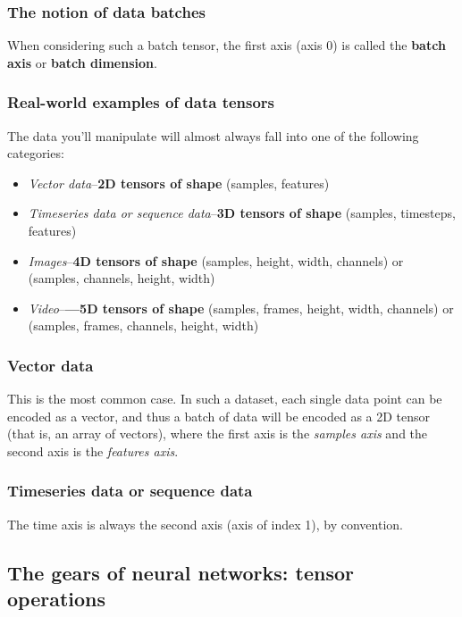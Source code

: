 \documentclass{article}
\numberwithin{equation}{section} %
\begin{document}
\subsubsection{The notion of data batches}

When considering such a batch tensor, the first axis (axis 0) is called the \textbf{batch axis} or \textbf{batch dimension}.

\subsubsection{Real-world examples of data tensors}

The data you’ll manipulate will almost always fall into one of the following categories: \\

\begin{itemize}
	\item \textit{Vector data}--\textbf{2D tensors of shape} (samples, features)
	\item \textit{Timeseries data or sequence data}--\textbf{3D tensors of shape} (samples, timesteps, features)
	\item \textit{Images}--\textbf{4D tensors of shape} (samples, height, width, channels) or (samples, channels, height, width)
	\item \textit{Video}--\textbf{—5D tensors of shape} (samples, frames, height, width, channels) or (samples, frames, channels, height, width)
\end{itemize}

\subsubsection{Vector data}

This is the most common case. In such a dataset, each single data point can be encoded as a vector, and thus a batch of data will be encoded as a 2D tensor (that is, an array of vectors), where the first axis is the \textit{samples axis} and the second axis is the \textit{features axis}. 

\subsubsection{Timeseries data or sequence data}

The time axis is always the second axis (axis of index 1), by convention.


\subsection{The gears of neural networks: tensor operations}
\end{document}
